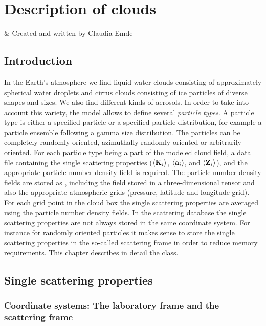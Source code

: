 \chapter{Description of clouds}
 \label{sec:clouds}

 & Created and written by Claudia Emde\\ 
\stophistory

\section{Introduction}

In the Earth's atmosphere we find liquid water clouds consisting of
approximately spherical water droplets and cirrus clouds consisting of
ice particles of diverse shapes and sizes. We also find different
kinds of aerosols. In order to take into account this variety, the
model allows to define several \emph{particle types}. A particle type
is either a specified particle or a specified particle distribution,
for example a particle ensemble following a gamma size distribution.
The particles can be completely randomly oriented, azimuthally
randomly oriented or arbitrarily oriented. For each particle type
being a part of the modeled cloud field, a data file containing the
single scattering properties ($\langle{\bf K}_i\rangle$,
$\langle{\bf a}_i\rangle$, and $\langle{\bf Z}_i\rangle$), and the
appropriate particle number density field is required. The particle
number density fields are stored as , including the
field stored in a three-dimensional tensor and also the appropriate
atmospheric grids (pressure, latitude and longitude grid). For each
grid point in the cloud box the single scattering properties are
averaged using the particle number density fields.  In the scattering
database the single scattering properties are not always stored in the
same coordinate system. For instance for randomly oriented particles
it makes sense to store the single scattering properties in the
so-called scattering frame in order to reduce memory requirements. 
This chapter describes in detail the 
class. 

\section{Single scattering properties}
\label{sec:scattering:ssp}

\subsection[Coordinate systems]{Coordinate systems: The laboratory frame and the scattering frame}
\label{sec:scattering:coordinate_sytems}

